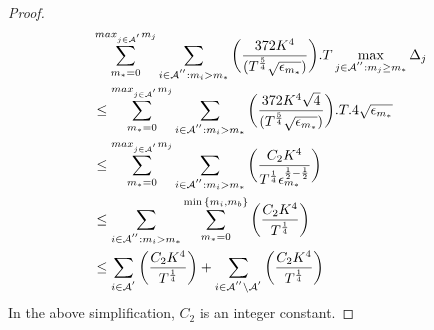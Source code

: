 \begin{proof}
\begin{align*}
&\sum_{m_{*}=0}^{max_{j\in \mathcal{A}^{'}}m_{j}}\sum_{i\in \mathcal{A}^{''}:m_{i}>m_{*}}\bigg(\dfrac{372 K^4}{(T^{\frac{5}{4}}\sqrt{\epsilon_{m_{*}}})} \bigg).T\max_{j\in \mathcal{A}^{''}:m_{j}\geq m_{*}}{\Delta}_{j}\\
&\leq\sum_{m_{*}=0}^{max_{j\in \mathcal{A}^{'}}m_{j}}\sum_{i\in \mathcal{A}^{''}:m_{i}>m_{*}}\bigg(\dfrac{372 K^4 \sqrt{4}}{(T^{\frac{5}{4}}\sqrt{\epsilon_{m_{*}}})} \bigg).T.4\sqrt{\epsilon_{m_{*}}}\\
&\leq\sum_{m_{*}=0}^{max_{j\in \mathcal{A}^{'}}m_{j}}\sum_{i\in \mathcal{A}^{''}:m_{i}>m_{*}}\bigg(\dfrac{C_2 K^4}{T^{\frac{1}{4}}\epsilon_{m_{*}}^{\frac{1}{2}-\frac{1}{2}}} \bigg)\\
&\leq\sum_{i\in \mathcal{A}^{''}:m_{i}>m_{*}}\sum_{m_{*}=0}^{\min{\lbrace m_{i},m_{b}\rbrace}}\bigg(\dfrac{C_2 K^4}{T^{\frac{1}{4}}} \bigg)\\
&\leq\sum_{i\in \mathcal{A}^{'}}\bigg(\dfrac{C_2 K^4}{T^{\frac{1}{4}}} \bigg)+\sum_{i\in \mathcal{A}^{''}\setminus \mathcal{A}^{'}}\bigg(\dfrac{C_2 K^4}{T^{\frac{1}{4}}} \bigg)\\
\end{align*}
In the above simplification, $C_2$ is an integer constant.



%



\end{proof}
